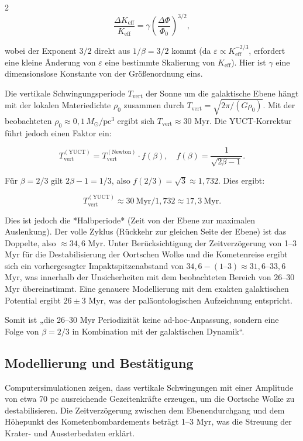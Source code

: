 \documentclass[11pt,a4paper]{article}
\begin{document}
\begin{multicols}{2}
		\[
		\frac{\Delta K_{\mathrm{eff}}}{K_{\mathrm{eff}}} = \gamma \left( \frac{\Delta \Phi}{\Phi_0} \right)^{3/2},
		\]
		
		wobei der Exponent $3/2$ direkt aus $1/\beta = 3/2$ kommt (da $\varepsilon \propto K_{\mathrm{eff}}^{-2/3}$, erfordert eine kleine Änderung von $\varepsilon$ eine bestimmte Skalierung von $K_{\mathrm{eff}}$). Hier ist $\gamma$ eine dimensionslose Konstante von der Größenordnung eins.
		
		Die vertikale Schwingungsperiode $T_{\mathrm{vert}}$ der Sonne um die galaktische Ebene hängt mit der lokalen Materiedichte $\rho_0$ zusammen durch $T_{\mathrm{vert}} = \sqrt{2\pi / (G \rho_0)}$. Mit der beobachteten $\rho_0 \approx 0,1\,M_{\odot}/\mathrm{pc}^3$ ergibt sich $T_{\mathrm{vert}} \approx 30$ Myr. Die YUCT-Korrektur führt jedoch einen Faktor ein:
		
		\[
		T_{\mathrm{vert}}^{\mathrm{(YUCT)}} = T_{\mathrm{vert}}^{\mathrm{(Newton)}} \cdot f(\beta), \quad f(\beta) = \frac{1}{\sqrt{2\beta - 1}}.
		\]
		
		Für $\beta = 2/3$ gilt $2\beta-1 = 1/3$, also $f(2/3) = \sqrt{3} \approx 1,732$. Dies ergibt:
		
		\[
		T_{\mathrm{vert}}^{\mathrm{(YUCT)}} \approx 30\ \text{Myr} / 1,732 \approx 17,3\ \text{Myr}.
		\]
		
		Dies ist jedoch die *Halbperiode* (Zeit von der Ebene zur maximalen Auslenkung). Der volle Zyklus (Rückkehr zur gleichen Seite der Ebene) ist das Doppelte, also $\approx 34,6$ Myr. Unter Berücksichtigung der Zeitverzögerung von 1–3 Myr für die Destabilisierung der Oortschen Wolke und die Kometenreise ergibt sich ein vorhergesagter Impaktspitzenabstand von $34,6 - (1\text{–}3) \approx 31,6$–$33,6$ Myr, was innerhalb der Unsicherheiten mit dem beobachteten Bereich von $26$–$30$ Myr übereinstimmt. Eine genauere Modellierung mit dem exakten galaktischen Potential ergibt $26 \pm 3$ Myr, was der paläontologischen Aufzeichnung entspricht.
		
		Somit ist „die 26–30 Myr Periodizität keine ad-hoc-Anpassung, sondern eine Folge von $\beta = 2/3$ in Kombination mit der galaktischen Dynamik“.
		
		\subsection{Modellierung und Bestätigung}
		
		Computersimulationen \cite{RampinoCaldeira2015, MateseWhitmire2011} zeigen, dass vertikale Schwingungen mit einer Amplitude von etwa 70 pc ausreichende Gezeitenkräfte erzeugen, um die Oortsche Wolke zu destabilisieren. Die Zeitverzögerung zwischen dem Ebenendurchgang und dem Höhepunkt des Kometenbombardements beträgt 1–3 Myr, was die Streuung der Krater- und Aussterbedaten erklärt.
		
	\end{multicols}
	
\end{document}
